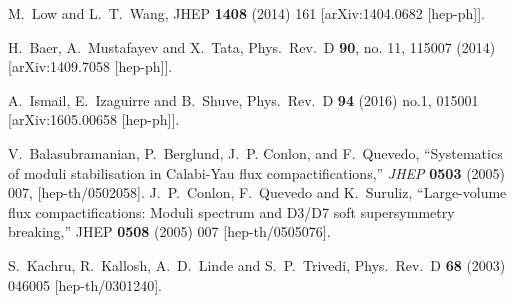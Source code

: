 \documentclass[11pt,a4paper]{article}
\begin{document}
\begin{thebibliography}{9}
  M.~Low and L.~T.~Wang,
  JHEP {\bf 1408} (2014) 161
  [arXiv:1404.0682 [hep-ph]].

  H.~Baer, A.~Mustafayev and X.~Tata,
  Phys.\ Rev.\ D {\bf 90}, no. 11, 115007 (2014)
  [arXiv:1409.7058 [hep-ph]].
     
  A.~Ismail, E.~Izaguirre and B.~Shuve,
  Phys.\ Rev.\ D {\bf 94} (2016) no.1,  015001
  [arXiv:1605.00658 [hep-ph]].
  
 
  
  
V.~Balasubramanian, P.~Berglund, J.~P. Conlon, and F.~Quevedo, ``{Systematics
  of moduli stabilisation in Calabi-Yau flux compactifications},''
 {{\em JHEP} {\bf 0503}
  (2005)  007},
[hep-th/0502058]. %
  J.~P.~Conlon, F.~Quevedo and K.~Suruliz,
  ``Large-volume flux compactifications: Moduli spectrum and D3/D7 soft supersymmetry breaking,''
  JHEP {\bf 0508} (2005) 007
  [hep-th/0505076].
  
  
  S.~Kachru, R.~Kallosh, A.~D.~Linde and S.~P.~Trivedi,
  Phys.\ Rev.\ D {\bf 68} (2003) 046005
  [hep-th/0301240].
  

\end{thebibliography}
\end{document}
